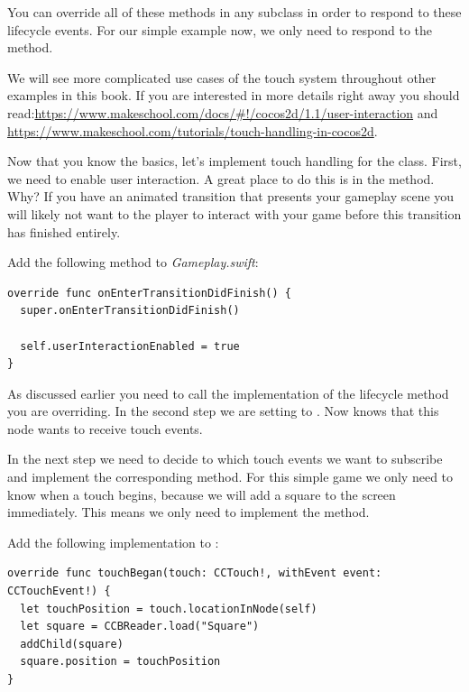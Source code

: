 You can override all of these methods in any \ccnode{} subclass in order to
respond to these lifecycle events. For our simple example now, we only need to
respond to the  method.

\begin{details}
We will see more complicated use cases of the \cocos{} touch system throughout
other examples in this book. If you are interested in more details right away
you should
read:\url{https://www.makeschool.com/docs/#!/cocos2d/1.1/user-interaction} and
\url{https://www.makeschool.com/tutorials/touch-handling-in-cocos2d}.
\end{details}

Now that you know the basics, let's implement touch handling for the
 class. First, we need to enable user interaction. A great
place to do this is in the  method. Why?
If you have an animated transition that presents your gameplay scene you will
likely not want to the player to interact with your game before this transition
has finished entirely. 
\begin{leftbar}
Add the following method to \textit{Gameplay.swift}:
\begin{lstlisting}
override func onEnterTransitionDidFinish() {
  super.onEnterTransitionDidFinish()
  
  self.userInteractionEnabled = true
}
\end{lstlisting}
\end{leftbar}
As discussed earlier you need to call the  implementation of
the lifecycle method you are overriding. In the second step we are setting
 to . Now \cocos{} knows
that this node wants to receive touch events. 

In the next step we need to decide to which touch events we
want to subscribe and implement the corresponding method. For this simple game
we only need to know when a touch begins, because we will add a square to the
screen immediately. This means we only need to implement the
 method. 

\begin{leftbar}
Add the following implementation to
:
\begin{lstlisting}
override func touchBegan(touch: CCTouch!, withEvent event: CCTouchEvent!) {
  let touchPosition = touch.locationInNode(self)
  let square = CCBReader.load("Square")
  addChild(square)
  square.position = touchPosition
}
\end{lstlisting}
\end{leftbar}

